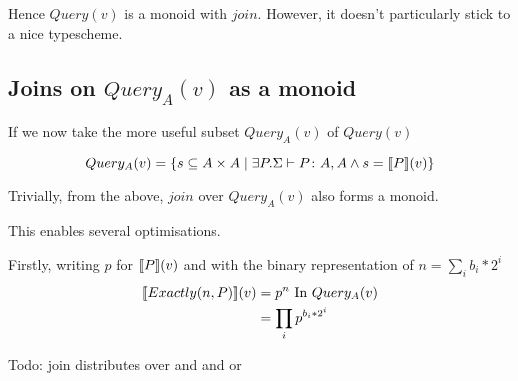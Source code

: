 \documentclass[twoside,a4paper,11pt]{article}
\newcommand{\db}[1]{{\bf [\![}#1{\bf ]\!]}}
\newcommand{\deno}[1]{\db{#1}(v)}
\newcommand{\setComp}[2]{\left\lbrace #1 \mid #2 \right\rbrace}
\newcommand{\typeRule}[2]{\Sigma\vdash #1 \colon #2}
\newcommand{\query}[0]{Query(v)}
\newcommand{\queryT}[1]{Query_{#1}(v)}
\begin{document}
Hence $\query$ is a monoid with $join$. However, it doesn't particularly stick to a nice typescheme.
	
\subsection{Joins on $\queryT{A}$ as a monoid}
If we now take the more useful subset $\queryT{A}$ of $\query$

\begin{equation}
\queryT{A} = \setComp{s \subseteq A \times A}{\exists P. \typeRule{P}{A, A} \wedge s = \deno{P}}
\end{equation}

Trivially, from the above, $join$ over $\queryT{A}$ also forms a monoid.

This enables several optimisations.

Firstly, writing $p$ for $\deno{P}$ and with the binary representation of $n = \sum_i{b_i * 2^{i}}$
\begin{equation}\label{ExactlyReordering}
\begin{split}
\deno{Exactly(n, P)} & = p^{n} \mbox{ In $\queryT{A}$}\\
					& = \prod_i {p^{b_i * 2^i} }
\end{split}
\end{equation}

Todo: join distributes over and and or
\end{document}
